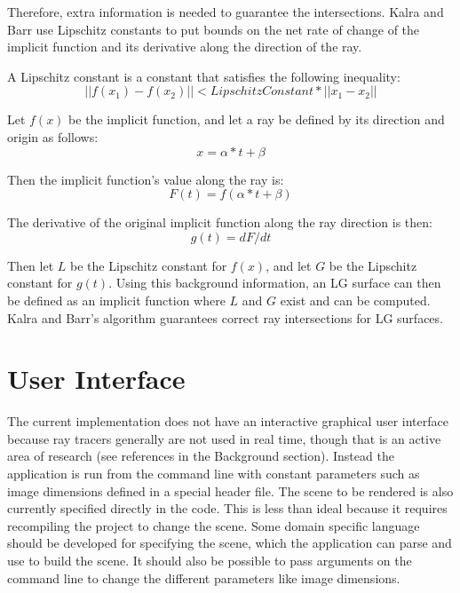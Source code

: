 \documentclass[conference]{acmsiggraph}
\begin{document}
Therefore, extra information is needed to guarantee the intersections.
Kalra and Barr use Lipschitz constants to put bounds
on the net rate of change of the implicit function and its derivative along
the direction of the ray.

A Lipschitz constant is a constant that satisfies the following inequality:
\begin{equation}
||f(x_1) - f(x_2)|| < LipschitzConstant * ||x_1 - x_2||
\end{equation}

Let $f(x)$ be the implicit function, and let a ray be defined by its direction 
and origin as follows:
\begin{equation}
x = \alpha * t + \beta
\end{equation}

Then the implicit function's value along the ray is:
\begin{equation}
F(t) = f(\alpha * t + \beta)
\end{equation}

The derivative of the original implicit function along the ray direction is 
then:
\begin{equation}
g(t) = dF/dt
\end{equation}

Then let $L$ be the Lipschitz constant for $f(x)$, and let $G$ be the Lipschitz
constant for $g(t)$.  Using this background information, an LG surface can
then be defined as an implicit function where $L$ and $G$ exist and can be
computed.  Kalra and Barr's algorithm guarantees correct ray intersections
for LG surfaces.

\section{User Interface}

The current implementation does not have an interactive graphical user 
interface because ray tracers generally are not used in real time,
though that is an active area of research (see references in the Background
section).  Instead the application is run from the command line with constant 
parameters such as image dimensions defined in a special header file.
The scene to be rendered is also currently specified directly in the 
code.  This is less than ideal because it requires recompiling the project to 
change the scene.  Some domain specific language should be developed
for specifying the scene, which the application can parse and
use to build the scene.  It should also be possible to pass arguments
on the command line to change the different parameters like
image dimensions.
\end{document}
